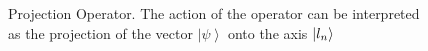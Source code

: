 \begin{figure}
\centering



\caption{Projection Operator. The action of the operator can be
  interpreted as the projection of the vector $\left|\psi\right>$ onto the axis $\ket{l_n}$}
\label{figAddProject}
\end{figure}